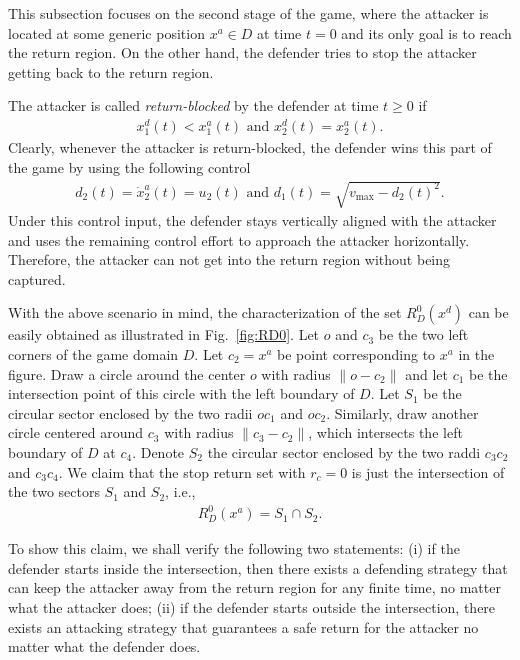 This subsection focuses on the second stage of the game, where the attacker is located at some generic position $x^a\in D$ at time $t=0$ and its only goal is to reach the return region. On the other hand, the defender tries to stop the attacker getting back to the return region. 

The attacker is called {\em return-blocked} by the defender at time $t\ge 0$ if 
\begin{align*}
x^d_1(t)<x_1^a(t) \text{ and } x^d_2(t) = x^a_2(t).
\end{align*}
Clearly, whenever the attacker is return-blocked, the defender wins this part of the game by using the following control
\begin{align*}
d_2(t) = \dot x^a_2(t)=u_2(t) \text{ and } d_1(t) = \sqrt{v_{\max} - d_2(t)^2}. 
\end{align*}
Under this control input, the defender stays vertically aligned with the attacker and uses the remaining control effort to approach the attacker horizontally. Therefore, the attacker can not get into the return region without being captured. 

With the above scenario in mind, the characterization of the set $R_D^0(x^d)$ can be easily obtained as illustrated in Fig.~\ref{fig:RD0}. Let $o$ and $c_3$ be the two left corners of the game domain $D$. Let $c_2=x^a$ be point corresponding to $x^a$ in the figure. Draw a circle around the center $o$ with radius $\|o-c_2\|$ and let $c_1$ be the intersection point of this circle with the left boundary of $D$. Let $S_1$ be the circular sector enclosed by the two radii $oc_1$ and $oc_2$. Similarly, draw another circle centered around $c_3$ with radius $\|c_3-c_2\|$, which intersects the left boundary of $D$ at $c_4$. Denote $S_2$ the circular sector enclosed by the two raddi $c_3c_2$ and $c_3c_4$. We claim that the stop return set with $r_c = 0$ is just the intersection of the two sectors $S_1$ and $S_2$, i.e.,
\begin{align}
\label{eq:RD0}
R_D^0(x^a) = S_1\cap S_2.
\end{align} 

To show this claim, we shall verify the following two statements: (i) if the defender starts inside the intersection, then there exists a defending strategy that can keep the attacker away from the return region for any finite time, no matter what the attacker does; (ii) if the defender starts outside the intersection, there exists an attacking strategy that guarantees a safe return for the attacker no matter what the defender does. 

